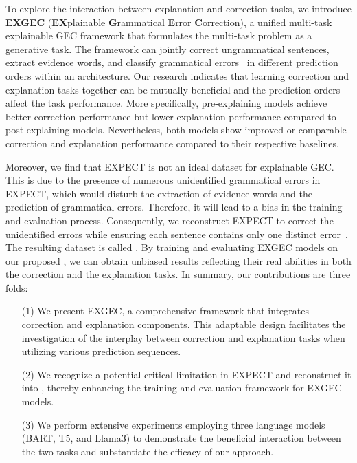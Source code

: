To explore the interaction between explanation and correction tasks, we introduce \textbf{EXGEC} (\textbf{EX}plainable \textbf{G}rammatical \textbf{E}rror \textbf{C}orrection), a unified multi-task explainable GEC framework that formulates the multi-task problem as a generative task. The framework can jointly correct ungrammatical sentences, extract evidence words, and classify grammatical errors~\cite{zou2025revisiting} in different prediction orders within an architecture. Our research indicates that learning correction and explanation tasks together can be mutually beneficial and the prediction orders affect the task performance. More specifically, pre-explaining models achieve better correction performance but lower explanation performance compared to post-explaining models. Nevertheless, both models show improved or comparable correction and explanation performance compared to their respective baselines.

Moreover, we find that EXPECT is not an ideal dataset for explainable GEC. This is due to the presence of numerous unidentified grammatical errors in EXPECT, which would disturb the extraction of evidence words and the prediction of grammatical errors. Therefore, it will lead to a bias in the training and evaluation process. Consequently, we reconstruct EXPECT to correct the unidentified errors while ensuring each sentence contains only one distinct error~\citep{fei-etal-2023-enhancing}. The resulting dataset is called \Dataset{}. By training and evaluating EXGEC models on our proposed \Dataset{}, we can obtain unbiased results reflecting their real abilities in both the correction and the explanation tasks. In summary, our contributions are three folds:

\begin{itemize}
\item [(1)] We present EXGEC, a comprehensive framework that integrates correction and explanation components. This adaptable design facilitates the investigation of the interplay between correction and explanation tasks when utilizing various prediction sequences.

\item [(2)] We recognize a potential critical limitation in EXPECT and reconstruct it into \Dataset{}, thereby enhancing the training and evaluation framework for EXGEC models.

\item [(3)] We perform extensive experiments employing three language models (BART, T5, and Llama3) to demonstrate the beneficial interaction between the two tasks and substantiate the efficacy of our approach.

\end{itemize}

